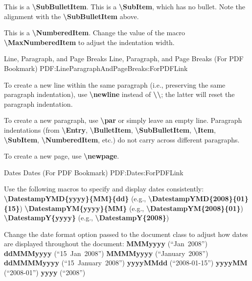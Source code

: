 \documentclass[letterpaper,MMMyyyy,nonstopmode]{simpleresumecv}
\newcommand{\CVNote}{CV compiled on {\today} with XeLaTeX for UTD}
\newcommand{\Code}[1]{\mbox{\textbf{#1}}}
\newcommand{\CodeCommand}[1]{\mbox{\textbf{\textbackslash{#1}}}}
\begin{document}
	\Gap
	\SubBulletItem
	This is a \CodeCommand{SubBulletItem}.
	\SubItem
	This is a \CodeCommand{SubItem}, which has no bullet.
	Note the alignment with the \CodeCommand{SubBulletItem} above.
	
	\Gap
	\NumberedItem{[42]}
	This is a \CodeCommand{NumberedItem}.
	Change the value of the macro \CodeCommand{MaxNumberedItem} to adjust the indentation width.
	
	\BigGap
	\SubSection
	{Line, Paragraph, and Page Breaks}
	{Line, Paragraph, and Page Breaks (For PDF Bookmark)}
	{PDF:LineParagraphAndPageBreaks:ForPDFLink}
	
	\Gap
	\BulletItem
	To create a new line within the same paragraph (i.e., preserving the same paragraph indentation), use 		\CodeCommand{newline} instead of \CodeCommand{\textbackslash};
	the latter will reset the paragraph indentation.

	\Gap
	\BulletItem
	To create a new paragraph, use \CodeCommand{par} or simply leave an empty line.
	Paragraph indentations (from
	\CodeCommand{Entry},
	\CodeCommand{BulletItem},
	\CodeCommand{SubBulletItem},
	\CodeCommand{Item},
	\CodeCommand{SubItem},
	\CodeCommand{NumberedItem},
	etc.) do not carry across different paragraphs.
	
	\Gap
	\BulletItem
	To create a new page, use \CodeCommand{newpage}.
	
	\BigGap
	\SubSection
	{Dates}
	{Dates (For PDF Bookmark)}
	{PDF:Dates:ForPDFLink}
	
	\Gap
	\BulletItem
	Use the following macros to specify and display dates consistently:
	\SubBulletItem
	\CodeCommand{DatestampYMD\{yyyy\}\{MM\}\{dd\}}
	(e.g., \CodeCommand{DatestampYMD\{2008\}\{01\}\{15\}})
	\SubBulletItem
	\CodeCommand{DatestampYM\{yyyy\}\{MM\}}
	(e.g., \CodeCommand{DatestampYM\{2008\}\{01\}})
	\SubBulletItem
	\CodeCommand{DatestampY\{yyyy\}}
	(e.g., \CodeCommand{DatestampY\{2008\}})
	
	\Gap
	\BulletItem
	Change the date format option passed to the document class to adjust how dates are displayed throughout the document:
	\SubBulletItem
	\Code{MMMyyyy} (``Jan~2008'')
	\SubBulletItem
	\Code{ddMMMyyyy} (``15~Jan~2008'')
	\SubBulletItem
	\Code{MMMMyyyy} (``January~2008'')
	\SubBulletItem
	\Code{ddMMMMyyyy} (``15~January~2008'')
	\SubBulletItem
	\Code{yyyyMMdd} (``2008-01-15'')
	\SubBulletItem
	\Code{yyyyMM} (``2008-01'')
	\SubBulletItem
	\Code{yyyy} (``2008'')

	\endgroup
\fi

\iffalse
    \UseNoteFont%
    \null\hfill%
    [\textit{\CVNote}]
\fi
\end{document}
